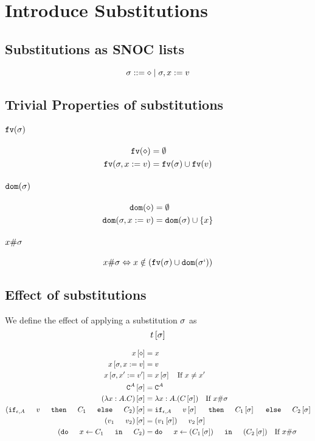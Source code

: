 \documentclass{report}
\begin{document}
\section{Introduce Substitutions}
\subsection{Substitutions as SNOC lists}

\begin{equation}
   \sigma ::= \diamond \mid \sigma, x := v
\end{equation}

\subsection{Trivial Properties of substitutions}
\paragraph{$\texttt{fv}(\sigma)$}
\begin{align}
    \texttt{fv}(\diamond) &= \emptyset\\
    \texttt{fv}(\sigma, x:= v) &= \texttt{fv}(\sigma)\cup\texttt{fv}(v)
\end{align}
\paragraph{$\texttt{dom}(\sigma)$}
\begin{align}
    \texttt{dom}(\diamond) & = \emptyset\\
    \texttt{dom}(\sigma, x:= v) & = \texttt{dom}(\sigma)\cup\left\{x\right\}
\end{align}

\paragraph{$x \# \sigma$}
\begin{equation}
    x \# \sigma \Leftrightarrow x\notin(\texttt{fv}(\sigma)\cup\texttt{dom}(\sigma`))
\end{equation}

\subsection{Effect of substitutions}
    We define the effect of applying a substitution $\sigma$ as 
    $$t\left[\sigma\right]$$

    
    \begin{align}
        x\sub{\nil} & = x \\
        x\sub{\si,x\setto v} & = v \\
        x\sub{\si,x'\setto v'} & = x\ssi\qt{If }x \neq x'\\
        \const{A}\ssi & = \const{A} \\
        (\lam{x}{A}{C})\ssi &= \lam{x}{A}{(C\ssi)}\qt{If }x\#\si\\
        (\ifthenelse{\e}{A}{v}{C_1}{C_2})\ssi &= \ifthenelse{\e}{A}{v\ssi}{C_1\ssi}{C_2\ssi}\\
        (\apply{v_1}{v_2})\ssi&= \apply{(v_1\ssi)}{v_2\ssi}\\
        (\doin{x}{C_1}{C_2})&= \doin{x}{(C_1\ssi)}{(C_2\ssi)}\qt{If } x\#\si\\
    \end{align}
\end{document}
